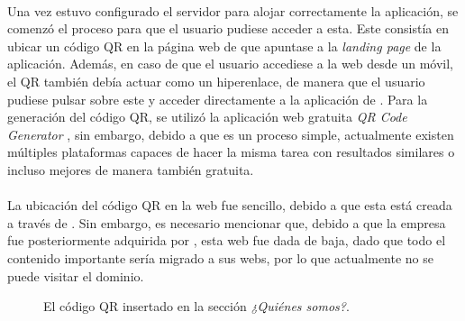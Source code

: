 \documentclass{subfiles}
\begin{document}
    \paragraph{}
    Una vez estuvo configurado el servidor para alojar correctamente la aplicación, se comenzó el proceso para que el usuario pudiese acceder a esta. Este consistía en ubicar un código QR en la página web de \silverstorm que apuntase a la \textit{landing page} de la aplicación. Además, en caso de que el usuario accediese a la web desde un móvil, el QR también debía actuar como un hiperenlace, de manera que el usuario pudiese pulsar sobre este y acceder directamente a la aplicación de \ra. Para la generación del código QR, se utilizó la aplicación web gratuita \textit{QR Code Generator} \cite{web:qrcodegenerator}, sin embargo, debido a que es un proceso simple, actualmente existen múltiples plataformas capaces de hacer la misma tarea con resultados similares o incluso mejores de manera también gratuita.

    \paragraph{}
    La ubicación del código QR en la web fue sencillo, debido a que esta está creada a través de \wordpress. Sin embargo, es necesario mencionar que, debido a que la empresa fue posteriormente adquirida por \thirdera, esta web fue dada de baja, dado que todo el contenido importante sería migrado a sus webs, por lo que actualmente no se puede visitar el dominio.

    \begin{figure}%
    \centering
    \caption{El código QR insertado en la sección \textit{¿Quiénes somos?}.}
    \label{fig:5.1_qr_web}
    \end{figure}
\end{document}
